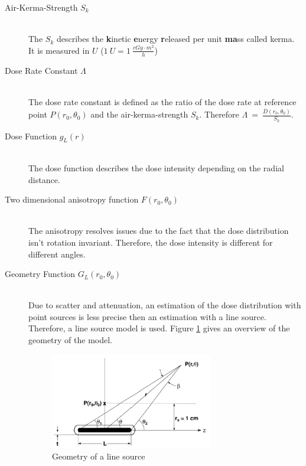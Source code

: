 \documentclass[12pt]{article}
\begin{document}
\begin{description}
\item[Air-Kerma-Strength $S_{k}$]~\\
The $S_{k}$ describes the \textbf{k}inetic \textbf{e}nergy \textbf{r}eleased per unit \textbf{ma}ss called kerma. It is measured in $U$ ($1\ U =1 \ \frac{cGy \cdot m^{2}}{h} $)   
\item[Dose Rate Constant $\Lambda$]~\\
The dose rate constant is defined as the ratio of the dose rate at reference point $ P(r_{0},\theta_{0})  $ and the air-kerma-strength $S_{k}$. Therefore $ \Lambda \ = \ \frac{\dot{D}(r_{0},\theta_{0})}{S_{k}} $.



\item[Dose Function $g_{L}(r)$]~\\
The dose function describes the dose intensity depending on the radial distance.


\item[Two dimensional anisotropy function $ F(r_{0},\theta_{0})$]~\\
The anisotropy resolves issues due to the fact that the dose distribution isn't rotation invariant. Therefore, the dose intensity is different for different angles.


\item[Geometry Function $G_{L}(r_{0},\theta_{0})$ ]~\\
Due to scatter and attenuation, an estimation of the dose distribution with point sources is less precise then an estimation with a line source. Therefore, a line source model is used. Figure \ref{fig:geometry} gives an overview of the geometry of the model.

\begin{figure}[hbtp]


\centering
\includegraphics[width=0.7\textwidth]{pictures/geometry}
\caption{Geometry of a line source}
\label{fig:geometry}	
\end{figure}
\end{description}
\end{document}
